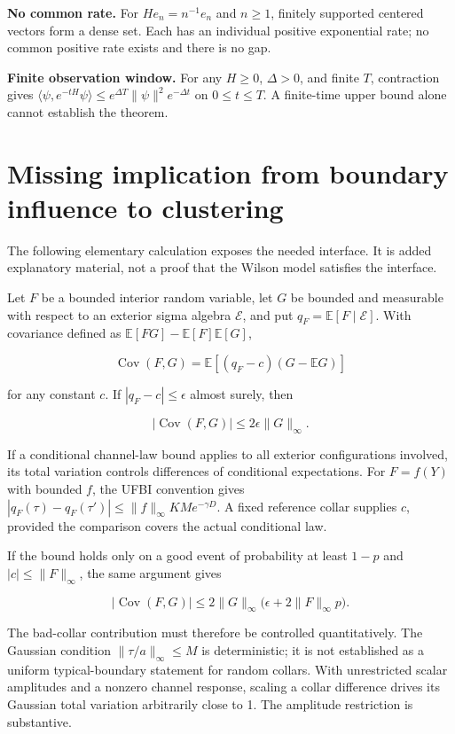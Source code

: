 \documentclass[
  11pt,
  letterpaper,
]{article}
\begin{document}
\textbf{No common rate.} For \(He_n=n^{-1}e_n\) and \(n\ge1\), finitely
supported centered vectors form a dense set. Each has an individual
positive exponential rate; no common positive rate exists and there is
no gap.

\textbf{Finite observation window.} For any \(H\ge0\), \(\Delta>0\), and
finite \(T\), contraction gives
\(\langle\psi,e^{-tH}\psi\rangle\le e^{\Delta T}\|\psi\|^2e^{-\Delta t}\)
on \(0\le t\le T\). A finite-time upper bound alone cannot establish the
theorem.

\section{Missing implication from boundary influence to
clustering}\label{missing-implication-from-boundary-influence-to-clustering}

The following elementary calculation exposes the needed interface. It is
added explanatory material, not a proof that the Wilson model satisfies
the interface.

Let \(F\) be a bounded interior random variable, let \(G\) be bounded
and measurable with respect to an exterior sigma algebra \(\mathcal E\),
and put \(q_F=\mathbb E[F\mid\mathcal E]\). With covariance defined as
\(\mathbb E[FG]-\mathbb E[F]\mathbb E[G]\),

\[
\operatorname{Cov}(F,G)
=\mathbb E[(q_F-c)(G-\mathbb E G)]
\]

for any constant \(c\). If \(|q_F-c|\le\epsilon\) almost surely, then

\[
|\operatorname{Cov}(F,G)|\le2\epsilon\|G\|_\infty.
\]

If a conditional channel-law bound applies to all exterior
configurations involved, its total variation controls differences of
conditional expectations. For \(F=f(Y)\) with bounded \(f\), the UFBI
convention gives
\(|q_F(\tau)-q_F(\tau')|\le\|f\|_\infty KM e^{-\gamma D}\). A fixed
reference collar supplies \(c\), provided the comparison covers the
actual conditional law.

If the bound holds only on a good event of probability at least \(1-p\)
and \(|c|\le\|F\|_\infty\), the same argument gives

\[
|\operatorname{Cov}(F,G)|
\le2\|G\|_\infty\bigl(\epsilon+2\|F\|_\infty p\bigr).
\]

The bad-collar contribution must therefore be controlled quantitatively.
The Gaussian condition \(\|\tau/a\|_\infty\le M\) is deterministic; it
is not established as a uniform typical-boundary statement for random
collars. With unrestricted scalar amplitudes and a nonzero channel
response, scaling a collar difference drives its Gaussian total
variation arbitrarily close to 1. The amplitude restriction is
substantive.
\end{document}
